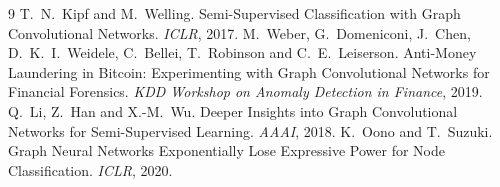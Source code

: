 \documentclass[11pt,a4paper]{article}
\begin{document}
\begin{thebibliography}{9}\small
{} T.~N.~Kipf and M.~Welling. Semi-Supervised Classification with Graph Convolutional Networks. \emph{ICLR}, 2017.
 M.~Weber, G.~Domeniconi, J.~Chen, D.~K.~I.~Weidele, C.~Bellei, T.~Robinson and C.~E.~Leiserson. Anti-Money Laundering in
Bitcoin: Experimenting with Graph Convolutional Networks for Financial Forensics. \emph{KDD Workshop on Anomaly Detection in Finance}, 2019.
 Q.~Li, Z.~Han and X.-M.~Wu. Deeper Insights into Graph Convolutional Networks for Semi-Supervised Learning. \emph{AAAI}, 2018.
 K.~Oono and T.~Suzuki. Graph Neural Networks Exponentially Lose Expressive Power for Node Classification. \emph{ICLR}, 2020.
\end{thebibliography}

\clearpage

\end{document}

